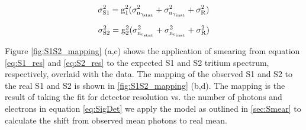 
\begin{equation}
 \rm \sigma_{S1}^2=g_1^2(\sigma_{n_{\gamma_{stat}}}^2+\sigma_{n_{\gamma_{inst}}}^2+\sigma_R^2)
\label{eq:S1_res}
\end{equation}

\begin{equation}
 \rm \sigma_{S2}^2=g_2^2(\sigma_{n_{e_{stat}}}^2+\sigma_{n_{e_{inst}}}^2+\sigma_R^2)
\label{eq:S2_res}
\end{equation}



Figure \ref{fig:S1S2_mapping} (a,c) shows the application of smearing from equation \ref{eq:S1_res} and \ref{eq:S2_res} to the expected S1 and S2 tritium spectrum, respectively, overlaid with the data. The mapping of the observed S1 and S2 to the real S1 and S2 is shown in \ref{fig:S1S2_mapping} (b,d). The mapping is the result of taking the fit for detector resolution vs. the number of photons and electrons in equation \ref{eq:SigDet} we apply the model as outlined in \ref{sec:Smear} to calculate the shift from observed mean photons to real mean. %

